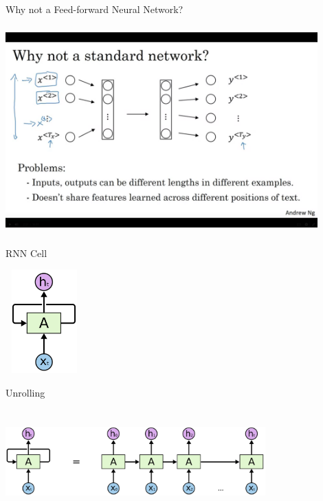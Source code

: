 \documentclass{beamer}
\begin{document}
\begin{frame}{Why not a Feed-forward Neural Network?}
    \begin{center}
        \includegraphics[width=12cm, height=8cm]{images/cnn_vs_rnn.png}    
    \end{center}
\end{frame}


\begin{frame}{RNN Cell}
    \begin{center}
        \includegraphics[width=3cm, height=4cm]{images/rnn_colah_blog.png}    
    \end{center}
\end{frame}

\begin{frame}{Unrolling}
    \begin{center}
        \includegraphics[width=10cm, height=4cm]{images/rnn_unrolled_colah_blog.png}    
    \end{center}
\end{frame}
\end{document}

